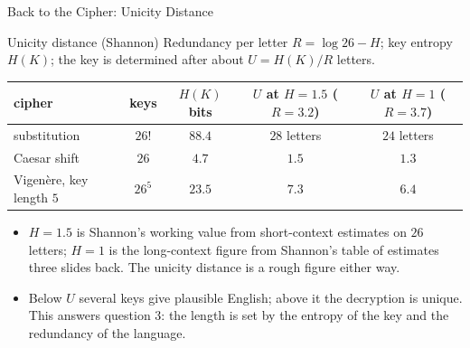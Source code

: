 \begin{frame}{Back to the Cipher: Unicity Distance}
  \small
  \begin{block}{Unicity distance (Shannon)}
    Redundancy per letter $R=\log26-H$; key entropy $H(K)$; the key is determined after about $U=H(K)/R$ letters.
    \begin{center}
      \renewcommand{\arraystretch}{1.15}
      \begin{tabular}{@{}lcccc@{}}
        \toprule
        cipher & keys & $H(K)$ bits & $U$ at $H=1.5$ ($R=3.2$) & $U$ at $H=1$ ($R=3.7$) \\
        \midrule
        substitution & $26!$ & $88.4$ & $28$ letters & $24$ letters \\
        Caesar shift & $26$ & $4.7$ & $1.5$ & $1.3$ \\
        Vigen\`ere, key length $5$ & $26^5$ & $23.5$ & $7.3$ & $6.4$ \\
        \bottomrule
      \end{tabular}
    \end{center}
  \end{block}
  \begin{itemize}
    \item $H=1.5$ is Shannon's working value from short-context estimates on $26$ letters; $H=1$ is the long-context figure from Shannon's table of estimates three slides back. The unicity distance is a rough figure either way.
    \item Below $U$ several keys give plausible English; above it the decryption is unique. This answers question 3: the length is set by the entropy of the key and the redundancy of the language.
  \end{itemize}
\end{frame}
